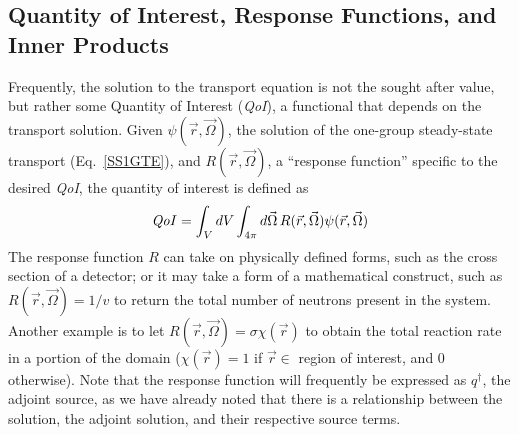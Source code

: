 \documentclass[12pt]{report}
\newcommand{\vr}{\vec{r}}
\newcommand{\vO}{\vec{\Omega}}
\newcommand{\qoi}{{\it QoI}\xspace}
\begin{document}
\subsection{Quantity of Interest, Response Functions, and Inner Products}
Frequently, the solution to the transport equation is not the sought after value, but rather some Quantity of Interest (\qoi), a functional that depends on the transport solution. Given $\psi(\vr,\vO)$, the solution of the one-group steady-state transport (Eq.~\eqref{SS1GTE}), and $R(\vr, \vO)$, a ``response function'' specific to the desired \qoi, the quantity of interest is defined as
\begin{equation}
\qoi =  \int_V dV \int_{4 \pi} d \vO \,  R(\vr, \vO) \psi(\vr, \vO)
\end{equation}
The response function $R$ can take on physically defined forms, such as the cross section of a detector; or it may take a form of a mathematical construct, such as $R(\vr, \vO)=1/v$ to return the total number of neutrons present in the system. Another example is to let $R(\vr, \vO)=\sigma \chi(\vr)$ to obtain the total reaction rate in a portion of the domain ($\chi(\vr)=1$ if $\vr \in$ region of interest, and 0 otherwise). Note that the response function will frequently be expressed as $q^\dag$, the adjoint source, as we have already noted that there is a relationship between the solution, the adjoint solution, and their respective source terms. 
\end{document}
